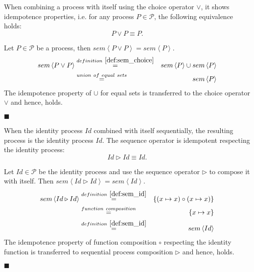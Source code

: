 \begin{theorem}
\label{thm:idempotence_choice}
When combining a process with itself using the choice operator $\vee$, it shows idempotence properties, i.e. for any process $P \in \mathcal{P}$, the following equivalence holds:
\begin{equation*}
  P \vee P \equiv P.
\end{equation*}
\end{theorem}

\begin{myproof}
Let $P \in \mathcal{P}$ be a process, then $sem \left\langle P \vee P \right\rangle = sem \left\langle P \right\rangle$.
\begin{eqnarray*}
  sem \left\langle P \vee P \right\rangle & \overset{\defref{def:sem_choice}}{=} & sem \left\langle P \right\rangle \cup sem \left\langle P \right\rangle \\
  & \overset{union\ of\ equal\ sets}{=} & sem \left\langle P \right\rangle
\end{eqnarray*}
The idempotence property of $\cup$ for equal sets is transferred to the choice operator $\vee$ and hence,  holds.

\hfill$\blacksquare$
\end{myproof}

\begin{theorem}
\label{thm:idempotence_identity}
When the identity process $Id$ combined with itself sequentially, the resulting process is the identity process $Id$. The sequence operator is idempotent respecting the identity process:
\begin{equation*}
  Id \triangleright Id \equiv Id.
\end{equation*}
\end{theorem}

\begin{myproof}
Let $Id \in \mathcal{P}$ be the identity process and use the sequence operator $\triangleright$ to compose it with itself. Then $sem \left\langle Id \triangleright Id \right\rangle = sem \left\langle Id \right\rangle$.
\begin{eqnarray*}
  sem \left\langle Id \triangleright Id \right\rangle & \overset{\defref{def:sem_id}}{=} & \left\{ \left( x \mapsto x \right) \circ \left( x \mapsto x \right) \right\} \\
  & \overset{function \ composition}{=} & \left\{ x \mapsto x \right\} \\
  & \overset{\defref{def:sem_id}}{=} & sem \left\langle Id \right\rangle
\end{eqnarray*}
The idempotence property of function composition $\circ$ respecting the identity function is transferred to sequential process composition $\triangleright$ and hence,  holds.

\hfill$\blacksquare$
\end{myproof}

\begin{myproof}
\end{myproof}

\begin{myproof}
\end{myproof}

